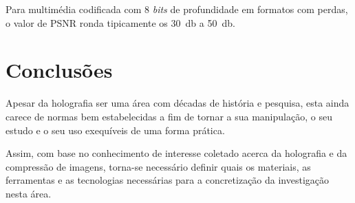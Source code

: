 Para multimédia codificada com 8 \textit{bits} de profundidade em formatos com perdas, o valor de \ac{PSNR} ronda tipicamente os \SI{30}{\decibel} a \SI{50}{\decibel}\cite{welstead1999fractal,barni2006document}.


\section{Conclusões}
\label{sec::estado-arte:conclusao}
Apesar da holografia ser uma área com décadas de história e pesquisa, esta ainda carece de normas bem estabelecidas a fim de tornar a sua manipulação, o seu estudo e o seu uso exequíveis de uma forma prática.

Assim, com base no conhecimento de interesse coletado acerca da holografia e da compressão de imagens, torna-se necessário definir quais os materiais, as ferramentas e as tecnologias necessárias para a concretização da investigação nesta área.
